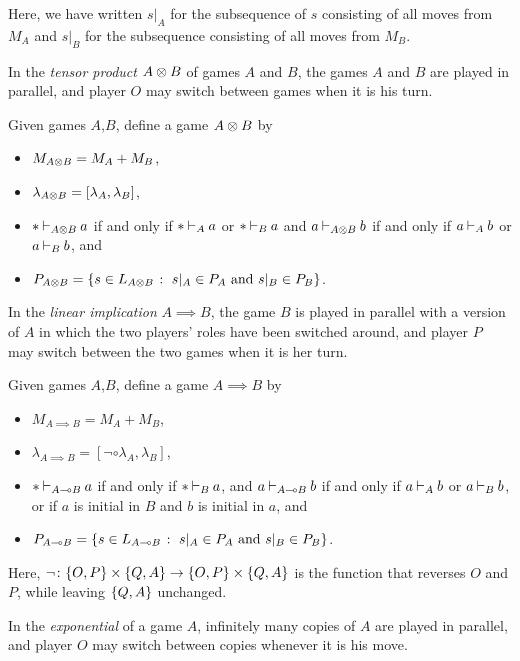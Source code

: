\documentclass[11pt]{report}
\begin{document}
Here, we have written $s\vert_A$ for the subsequence of $s$ consisting of all moves from $M_A$ and $s\vert_B$ for the subsequence consisting of all moves from $M_B$.

In the \emph{tensor product} $A\otimes B$ of games $A$ and $B$, the games $A$ and $B$ are played in parallel, and player $O$ may switch between games when it is his turn.

\begin{definition}
  Given games $A$,$B$, define a game $A\otimes B$ by
  \begin{itemize}
    \item $M_{A\otimes B} = M_A + M_B$,
    \item $\lambda_{A\otimes B} = [\lambda_A,\lambda_B]$,
    \item $* \mathbin{\vdash}_{A\otimes B} a$ if and only if $*\mathbin{\vdash}_A a$ or $*\mathbin{\vdash}_B a$ and $a \mathbin{\vdash}_{A\otimes B} b$ if and only if $a \mathbin{\vdash}_A b$ or $a\mathbin{\vdash}_B b$, and
    \item $P_{A\otimes B} = \{s\in L_{A\otimes B} \;\colon\; \text{$s\vert_A\in P_A$ and $s\vert_B\in P_B$}\}$.
  \end{itemize}
\end{definition}

In the \emph{linear implication} $A\implies B$, the game $B$ is played in parallel with a version of $A$ in which the two players' roles have been switched around, and player $P$ may switch between the two games when it is her turn.

\begin{definition}
  Given games $A$,$B$, define a game $A\implies B$ by
  \begin{itemize}
    \item $M_{A\implies B} = M_A + M_B$,
    \item $\lambda_{A\implies B} = [\neg\circ\lambda_A,\lambda_B]$,
    \item $* \mathbin{\vdash}_{A\multimap B} a$ if and only if $*\mathbin{\vdash}_B a$, and $a \mathbin{\vdash}_{A\multimap B} b$ if and only if $a \mathbin{\vdash}_A b$ or $a\mathbin{\vdash}_B b$, or if $a$ is initial in $B$ and $b$ is initial in $a$, and
    \item $P_{A\multimap B} = \{s\in L_{A\multimap B} \;\colon\; \text{$s\vert_A\in P_A$ and $s\vert_B\in P_B$}\}$.
  \end{itemize}
\end{definition}

Here, $\neg\colon \{O,P\}\times\{Q,A\} \to \{O,P\}\times \{Q,A\}$ is the function that reverses $O$ and $P$, while leaving $\{Q,A\}$ unchanged.

In the \emph{exponential} of a game $A$, infinitely many copies of $A$ are played in parallel, and player $O$ may switch between copies whenever it is his move.
\end{document}
